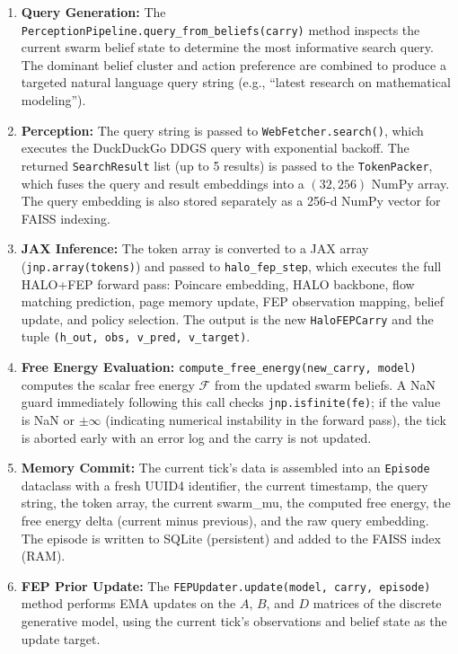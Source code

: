\begin{enumerate}
    \item \textbf{Query Generation:} The \texttt{PerceptionPipeline.query\_from\_beliefs(carry)} method inspects the current swarm belief state to determine the most informative search query. The dominant belief cluster and action preference are combined to produce a targeted natural language query string (e.g., ``latest research on mathematical modeling'').

    \item \textbf{Perception:} The query string is passed to \texttt{WebFetcher.search()}, which executes the DuckDuckGo DDGS query with exponential backoff. The returned \texttt{SearchResult} list (up to 5 results) is passed to the \texttt{TokenPacker}, which fuses the query and result embeddings into a $(32, 256)$ NumPy array. The query embedding is also stored separately as a 256-d NumPy vector for FAISS indexing.

    \item \textbf{JAX Inference:} The token array is converted to a JAX array (\texttt{jnp.array(tokens)}) and passed to \texttt{halo\_fep\_step}, which executes the full HALO+FEP forward pass: Poincare embedding, HALO backbone, flow matching prediction, page memory update, FEP observation mapping, belief update, and policy selection. The output is the new \texttt{HaloFEPCarry} and the tuple \texttt{(h\_out, obs, v\_pred, v\_target)}.

    \item \textbf{Free Energy Evaluation:} \texttt{compute\_free\_energy(new\_carry, model)} computes the scalar free energy $\mathcal{F}$ from the updated swarm beliefs. A NaN guard immediately following this call checks \texttt{jnp.isfinite(fe)}; if the value is NaN or $\pm\infty$ (indicating numerical instability in the forward pass), the tick is aborted early with an error log and the carry is not updated.

    \item \textbf{Memory Commit:} The current tick's data is assembled into an \texttt{Episode} dataclass with a fresh UUID4 identifier, the current timestamp, the query string, the token array, the current swarm\_mu, the computed free energy, the free energy delta (current minus previous), and the raw query embedding. The episode is written to SQLite (persistent) and added to the FAISS index (RAM).

    \item \textbf{FEP Prior Update:} The \texttt{FEPUpdater.update(model, carry, episode)} method performs EMA updates on the $A$, $B$, and $D$ matrices of the discrete generative model, using the current tick's observations and belief state as the update target.


\end{enumerate}
